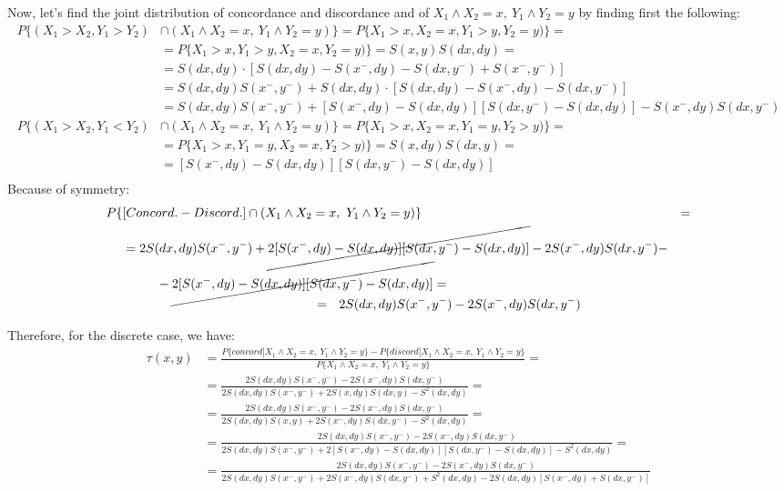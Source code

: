 \documentclass[]{article}
\begin{document}
Now, let's find the joint distribution of concordance and discordance and of $X_{1}\wedge X_{2} = x,~Y_{1}\wedge Y_{2} = y$ by finding first the following:
	$$
	\begin{aligned}
		P\{ (X_1>X_2, Y_1>Y_2) &\cap (X_{1}\wedge X_{2} = x,~Y_{1}\wedge Y_{2} = y) \} =P\{ X_1>x, X_2=x, Y_1>y, Y_2=y)\} = \\
    &= P\{ X_1>x, Y_1>y, X_2=x, Y_2=y)\} = S(x, y)S(dx,dy) = \\
    &=S(dx,dy)\cdot[S(dx,dy) - S(x^-,dy) - S(dx,y^-) + S(x^-,y^-) ]\\
    &=S(dx,dy) S(x^-,y^-) + S(dx,dy)\cdot[S(dx,dy) - S(x^-,dy) - S(dx,y^-)]\\
    &=S(dx,dy) S(x^-,y^-) + [S(x^-,dy) - S(dx,dy)][S(dx,y^-) - S(dx,dy)] - S(x^-,dy)S(dx,y^-)\\
		P\{ (X_1>X_2, Y_1<Y_2) &\cap (X_{1}\wedge X_{2} = x,~Y_{1}\wedge Y_{2} = y) \} =P\{ X_1>x, X_2=x, Y_1=y, Y_2>y)\} = \\
    &= P\{ X_1>x, Y_1=y, X_2=x, Y_2>y)\} = S(x, dy)S(dx,y) = \\
    &=[S(x^-,dy) - S(dx,dy)][S(dx,y^-)  - S(dx,dy)]
	\end{aligned}
	$$
	$$
	\begin{aligned}
	\end{aligned}
	$$
  Because of symmetry:
	$$
	\begin{aligned}
		P\{&[Concord. - Discord.] \cap (X_{1}\wedge X_{2} = x,~Y_{1}\wedge Y_{2} = y) \} &= \\
      &=2S(dx,dy) S(x^-,y^-) + \cancel{2[S(x^-,dy) - S(dx,dy)][S(dx,y^-) - S(dx,dy)]} - 2S(x^-,dy)S(dx,y^-) - \\
      &~~~~~~~~-\cancel{2[S(x^-,dy) - S(dx,dy)][S(dx,y^-)  - S(dx,dy)]}=\\
      &~~~~~~~~~~~~~~~~~~~~~~~~~~~~~~~~~~~~~~~~~~~~~=~~2S(dx,dy) S(x^-,y^-) - 2S(x^-,dy)S(dx,y^-)
	\end{aligned}
	$$
  
  
Therefore, for the discrete case, we have:
  $$
  \begin{aligned}
    \tau(x, y) &= \frac{P\{concord| X_{1}\wedge X_{2} = x,~Y_{1}\wedge Y_{2} = y\} - P\{discord|X_{1}\wedge X_{2} = x,~Y_{1}\wedge Y_{2} = y\}}{P\{X_{1}\wedge X_{2} = x,~Y_{1}\wedge Y_{2} = y\}} = \\ 
      &= \frac{2S(dx,dy) S(x^-,y^-) - 2S(x^-,dy)S(dx,y^-)}{2S(dx, dy)S(x^-,y^-) + 2S(x,dy)S(dx, y) -S^2(dx,dy)}= \\
      &= \frac{2S(dx,dy) S(x^-,y^-) - 2S(x^-,dy)S(dx,y^-)}{2S(dx, dy)S(x,y)+ 2S(x^-,dy)S(dx, y^-)  -S^2(dx,dy)}=\\
      &= \frac{2S(dx,dy) S(x^-,y^-) - 2S(x^-,dy)S(dx,y^-)}{2S(dx, dy)S(x^-,y^-) + 2[S(x^-,dy)-S(dx,dy)][S(dx, y^-)-S(dx,dy)]  -S^2(dx,dy)}=\\
      &= \frac{2S(dx,dy) S(x^-,y^-) - 2S(x^-,dy)S(dx,y^-)}{2S(dx, dy)S(x^-,y^-) + 2S(x^-,dy)S(dx, y^-) + S^2(dx,dy) - 2S(dx,dy)[S(x^-,dy)+S(dx, y^-)]}\\
  \end{aligned}
  $$
\end{document}
